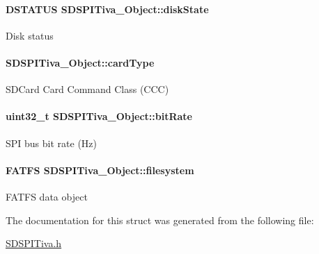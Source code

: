 \paragraph[{disk\-State}]{\setlength{\rightskip}{0pt plus 5cm}D\-S\-T\-A\-T\-U\-S S\-D\-S\-P\-I\-Tiva\-\_\-\-Object\-::disk\-State}\label{struct_s_d_s_p_i_tiva___object_ad6d1084d70028145483de412f3214e4b}
Disk status 
\paragraph[{card\-Type}]{ S\-D\-S\-P\-I\-Tiva\-\_\-\-Object\-::card\-Type}\label{struct_s_d_s_p_i_tiva___object_aff179e7ccea883efed7d8d16f6fd9917}
S\-D\-Card Card Command Class (C\-C\-C) 
\paragraph[{bit\-Rate}]{\setlength{\rightskip}{0pt plus 5cm}uint32\-\_\-t S\-D\-S\-P\-I\-Tiva\-\_\-\-Object\-::bit\-Rate}\label{struct_s_d_s_p_i_tiva___object_a1cd6cec603b463bb38884ca6b0f939cc}
S\-P\-I bus bit rate (Hz) 
\paragraph[{filesystem}]{\setlength{\rightskip}{0pt plus 5cm}F\-A\-T\-F\-S S\-D\-S\-P\-I\-Tiva\-\_\-\-Object\-::filesystem}\label{struct_s_d_s_p_i_tiva___object_a64192599a4d272f2b931c5f8a42df808}
F\-A\-T\-F\-S data object 

The documentation for this struct was generated from the following file\-:\begin{DoxyCompactItemize}
\item 
\hyperlink{_s_d_s_p_i_tiva_8h}{S\-D\-S\-P\-I\-Tiva.\-h}\end{DoxyCompactItemize}
